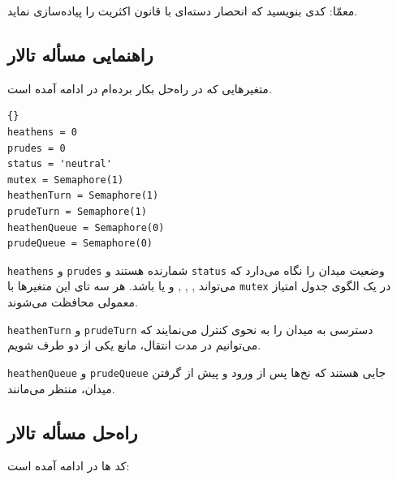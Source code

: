 \documentclass{book}
\newcommand{\clearemptydoublepage}{}%
\begin{document}
    معمّا: کدی بنویسید که انحصار دسته‌ای با قانون اکثریت را پیاده‌سازی نماید. 



\clearemptydoublepage
\subsection{راهنمایی مسأله تالار  }

    متغیرهایی که در راه‌حل بکار برده‌ام در ادامه آمده است. 

\begin{latin}
\begin{lstlisting}[title=\rl{راهنمایی مسأله تالار \lr{Modus}}]{}
heathens = 0
prudes = 0
status = 'neutral'
mutex = Semaphore(1)
heathenTurn = Semaphore(1)
prudeTurn = Semaphore(1)
heathenQueue = Semaphore(0)
prudeQueue = Semaphore(0)
\end{lstlisting}
\end{latin}

    {\tt heathens} و {\tt prudes} 
    شمارنده هستند و  {\tt status} وضعیت میدان را نگاه می‌دارد که می‌تواند 
    , ,
    ,  و یا  باشد.
    هر سه تای این متغیرها با {\tt mutex} در یک الگوی جدول امتیاز معمولی محافظت می‌شوند. 
    


    {\tt heathenTurn} و {\tt prudeTurn} 
    دسترسی به میدان را به نحوی کنترل می‌نمایند که می‌توانیم در مدت انتقال، مانع یکی از دو طرف شویم. 

    {\tt heathenQueue} و {\tt prudeQueue}
    جایی هستند که نخ‌ها پس از ورود و پیش از گرفتن میدان، منتظر می‌مانند. 
    

\clearemptydoublepage
\subsection{راه‌حل مسأله تالار  }

    کد ها در ادامه آمده است:‌ 
\end{document}
